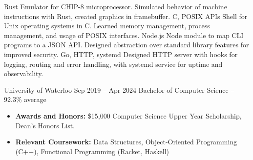 \documentclass{article}
\begin{document}
\normalsize
{}
{Rust}
{Emulator for CHIP-8 microprocessor. Simulated behavior of machine instructions with
Rust, created graphics in framebuffer.}
\vspace{1.5mm}
{C, POSIX APIs}
{Shell for Unix operating systems in C. Learned memory management, process management,
and usage of POSIX interfaces. }
\vspace{1.5mm}
{Node.js}
{Node module to map CLI programs to a JSON API. Designed abstraction over standard
library features for improved security.}
\vspace{1.5mm}
{Go, HTTP, systemd}
{Designed HTTP server with hooks for logging, routing and error handling, with systemd service for uptime and observability.}

\EducationEntry
{University of Waterloo}
{Sep 2019 -- Apr 2024}
{Bachelor of Computer Science -- 92.3\% average}
{\begin{itemize} \itemsep -1pt
    \vspace{1mm}
    \item {\bf Awards and Honors:} \$15,000 Computer Science Upper Year Scholarship, Dean's Honors List.
    \item {\bf Relevant Coursework:} Data Structures, Object-Oriented Programming (C++), Functional Programming (Racket, Haskell)
    \end{itemize}}
\vspace{-2mm}
\end{document}
